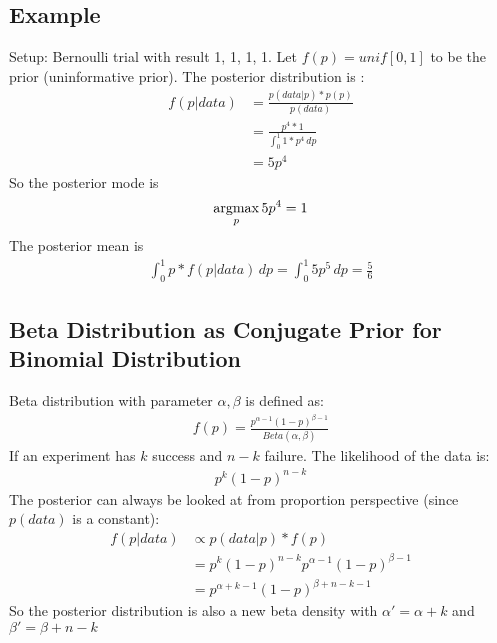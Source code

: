\subsection{Example}
Setup: Bernoulli trial with result 1, 1, 1, 1. Let $f(p) = unif[0,1]$ to be the prior (uninformative prior). The posterior distribution is :
    \begin{align*}
        f(p|data) 
        & = \frac{p(data|p) * p(p)}{p(data)} \\
        & = \frac{p^4 * 1}{\int_0^1 1 * p^4 \, dp} \\
        & = 5p^4
    \end{align*}
So the posterior mode is 
    \begin{align*}
        \operatorname*{argmax}_p 5p^4 = 1
    \end{align*}
The posterior mean is 
    \begin{align*}
    \int_0^1 p * f(p|data) \,dp = \int_0^1 5p^5\, dp = \frac{5}{6}
    \end{align*}

\subsection{Beta Distribution as Conjugate Prior for Binomial Distribution} 
Beta distribution with parameter $\alpha, \beta$ is defined as:
    \begin{align*}
        f(p) = \frac{p^{\alpha-1}(1-p)^{\beta-1}}{Beta(\alpha, \beta)}
    \end{align*}
If an experiment has $k$ success and $n-k$ failure. The likelihood of the data is: 
    \begin{align*}
        p^k (1-p)^{n-k}
    \end{align*}
The posterior can always be looked at from proportion perspective (since $p(data)$ is a constant): 
    \begin{align*}
    f(p|data) 
    & \propto p(data|p) * f(p) \\
    & = p^k (1-p)^{n-k} p^{\alpha-1}(1-p)^{\beta-1}\\
    & = p^{\alpha + k - 1} (1-p)^{\beta + n - k - 1}
    \end{align*}
So the posterior distribution is also a new beta density with $\alpha' = \alpha + k$ and $\beta' = \beta + n - k$

